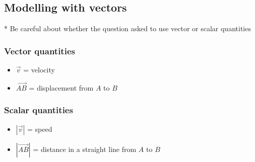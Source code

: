 \documentclass[A4paper]{article}
\begin{document}
	\subsection{Modelling with vectors}
	* Be careful about whether the question asked to use vector or scalar quantities
	\subsubsection{Vector quantities}
	\begin{itemize}
		\item $\vec{v}$ = velocity
		\item $\overrightarrow{AB}$ = displacement from $A$ to $B$
	\end{itemize}
	
	\subsubsection{Scalar quantities}
	\begin{itemize}
		\item $|\vec{v}|$ = speed
		\item $|\overrightarrow{AB}|$ = distance in a straight line from $A$ to $B$
	\end{itemize}
	
	
	
	
	
\end{document}
